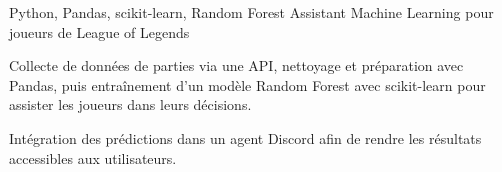 
\begin{cventries}
  \cventry
    {Python, Pandas, scikit-learn, Random Forest}
    {Assistant Machine Learning pour joueurs de League of Legends}
    {}
    {}
    {
      \begin{cvitems}
        \item {Collecte de données de parties via une API, nettoyage et préparation avec Pandas, puis entraînement d’un modèle Random Forest avec scikit-learn pour assister les joueurs dans leurs décisions.}
        \item {Intégration des prédictions dans un agent Discord afin de rendre les résultats accessibles aux utilisateurs.}
      \end{cvitems}
    }
\end{cventries}
